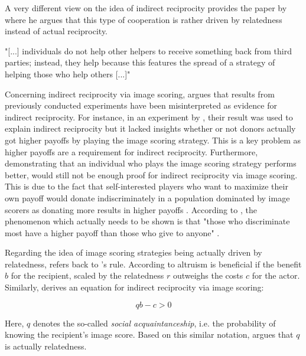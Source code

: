 \documentclass[sigconf]{acmart}
\begin{document}
    A very different view on the idea of indirect reciprocity provides the paper by \citeauthor{roberts_kin_2019} \cite{roberts_kin_2019} where he argues that this type of cooperation is rather driven by relatedness instead of actual reciprocity.

    "[...] individuals do not help other helpers to receive something back from third parties; instead, they help because this features the spread of a strategy of helping those who help others [...]" \cite{roberts_kin_2019}


    Concerning indirect reciprocity via image scoring, \citeauthor{roberts_kin_2019} argues that results from previously conducted experiments have been misinterpreted as evidence for indirect reciprocity.
    For instance, in an experiment by \citeauthor{milinski_reputation_2002} \cite{milinski_reputation_2002}, their result was used to explain indirect reciprocity but it lacked insights whether or not donors actually got higher payoffs by playing the image scoring strategy.
    This is a key problem as higher payoffs are a requirement for indirect reciprocity.
    Furthermore, demonstrating that an individual who plays the image scoring strategy performs better, would still not be enough proof for indirect reciprocity via image scoring.
    This is due to the fact that self-interested players who want to maximize their own payoff would donate indiscriminately in a population dominated by image scorers as donating more results in higher payoffs \cite{roberts_kin_2019}.
    According to \citeauthor{roberts_kin_2019}, the phenomenon which actually needs to be shown is that "those who discriminate most have a higher payoff than those who give to anyone" \cite{roberts_kin_2019}.

    Regarding the idea of image scoring strategies being actually driven by relatedness, \citeauthor{roberts_kin_2019} refers back to \citeauthor{hamilton_kin_1964}'s rule.
    According to  altruism is beneficial if the benefit $b$ for the recipient, scaled by the relatedness $r$ outweighs the costs $c$ for the actor.
    Similarly, \citeauthor{nowak_five_2006} \cite{nowak_five_2006} derives an equation for indirect reciprocity via image scoring:

    \begin{equation}
        qb - c > 0\label{eq:qb-c}
    \end{equation}

    Here, $q$ denotes the so-called \textit{social acquaintanceship}, i.e. the probability of knowing the recipient's image score.
    Based on this similar notation, \citeauthor{roberts_kin_2019} argues that $q$ is actually relatedness.
\end{document}
